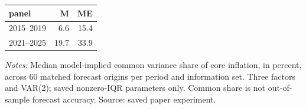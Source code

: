 \begin{threeparttable}
\begin{tabular}{lrr}
\toprule
panel & M & ME \\
\midrule
2015--2019 & 6.6 & 15.4 \\
2021--2025 & 19.7 & 33.9 \\
\bottomrule
\end{tabular}
\begin{tablenotes}[flushleft]\footnotesize
\item \textit{Notes:} Median model-implied common variance share of core inflation, in percent, across 60 matched forecast origins per period and information set. Three factors and VAR(2); saved nonzero-IQR parameters only. Common share is not out-of-sample forecast accuracy. Source: saved paper experiment.
\end{tablenotes}
\end{threeparttable}
